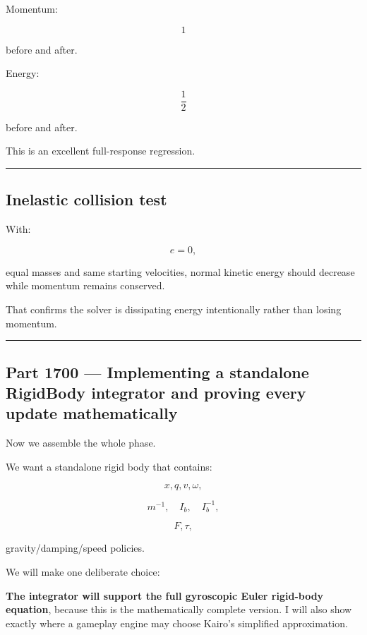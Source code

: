 Momentum:

\[
1
\]

before and after.

Energy:

\[
\frac12
\]

before and after.

This is an excellent full-response regression.

\begin{center}\rule{0.5\linewidth}{0.5pt}\end{center}

\subsection{Inelastic collision test}\label{06-engine-ii-ch039-inelastic-collision-test}

With:

\[
e=0,
\]

equal masses and same starting velocities, normal kinetic energy should decrease while momentum remains conserved.

That confirms the solver is dissipating energy intentionally rather than losing momentum.

\begin{center}\rule{0.5\linewidth}{0.5pt}\end{center}

\subsection{Part 1700 --- Implementing a standalone RigidBody integrator and proving every update mathematically}\label{06-engine-ii-ch039-part-1700-implementing-a-standalone-rigidbody-integrator-and-proving-every-update-mathematically}

Now we assemble the whole phase.

We want a standalone rigid body that contains:

\[
x,q,v,\omega,
\]

\[
m^{-1},
\quad
I_b,
\quad
I_b^{-1},
\]

\[
F,\tau,
\]

gravity/damping/speed policies.

We will make one deliberate choice:

\textbf{The integrator will support the full gyroscopic Euler rigid-body equation}, because this is the mathematically complete version. I will also show exactly where a gameplay engine may choose Kairo's simplified approximation.

